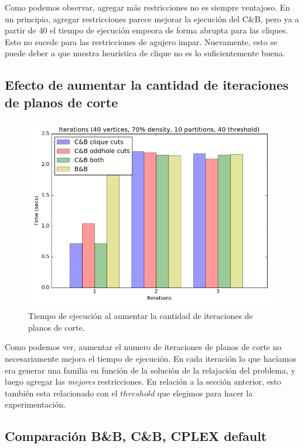 Como podemos observar, agregar más restricciones no es siempre ventajoso. En un principio, agregar restricciones parece mejorar la ejecución del C\&B, pero ya a partir de 40 el tiempo de ejecución empeora de forma abrupta para las cliques. Esto no sucede para las restricciones de agujero impar. Nuevamente, esto se puede deber a que nuestra heurística de clique no es lo suficientemente buena.

\subsection{Efecto de aumentar la cantidad de iteraciones de planos de corte}

\begin{figure}[h]
\centering
\includegraphics[scale=0.5]{img/7-iterations_v40_p10_l40_t1_b0.png}
\caption{Tiempo de ejecución al aumentar la cantidad de iteraciones de planos de corte.}
\end{figure}

Como podemos ver, aumentar el numero de iteraciones de planos de corte no necesariamente mejora el tiempo de ejecución. En cada iteración lo que hacíamos era generar una familia en función de la solución de la relajación del problema, y luego agregar las \textit{mejores} restricciones. En relación a la sección anterior, esto también esta relacionado con el $threshold$ que elegimos para hacer la experimentación.

\pagebreak

\subsection{Comparación B\&B, C\&B, CPLEX default}


